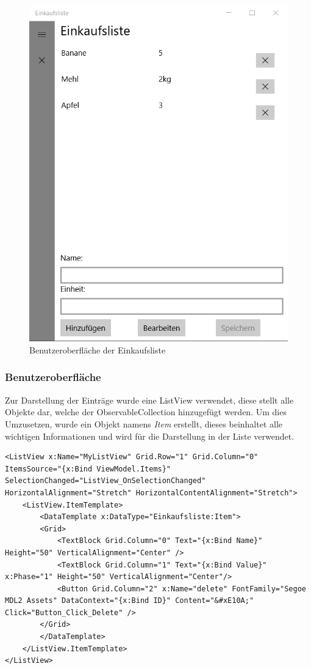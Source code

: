 \begin{figure}[H]
	\centering
	\includegraphics[width=0.7\linewidth]{img/screenshot001}
	\caption{Benutzeroberfläche der Einkaufsliste}
	\label{fig:screenshot001}
\end{figure}

\subsubsection{Benutzeroberfläche}

Zur Darstellung der Einträge wurde eine ListView verwendet, diese stellt alle Objekte dar, welche der ObservableCollection hinzugefügt werden. Um dies Umzusetzen, wurde ein Objekt namens \textit{Item} erstellt, dieses beinhaltet alle wichtigen Informationen und wird für die Darstellung in der Liste verwendet. \cite{listview}

\begin{verbatim}
<ListView x:Name="MyListView" Grid.Row="1" Grid.Column="0" ItemsSource="{x:Bind ViewModel.Items}" SelectionChanged="ListView_OnSelectionChanged" HorizontalAlignment="Stretch" HorizontalContentAlignment="Stretch">
	<ListView.ItemTemplate>
		<DataTemplate x:DataType="Einkaufsliste:Item">
		<Grid>
			<TextBlock Grid.Column="0" Text="{x:Bind Name}" Height="50" VerticalAlignment="Center" />
			<TextBlock Grid.Column="1" Text="{x:Bind Value}" x:Phase="1" Height="50" VerticalAlignment="Center"/>
			<Button Grid.Column="2" x:Name="delete" FontFamily="Segoe MDL2 Assets" DataContext="{x:Bind ID}" Content="&#xE10A;" Click="Button_Click_Delete" />	
		</Grid>
		</DataTemplate>
	</ListView.ItemTemplate>
</ListView>
\end{verbatim}


